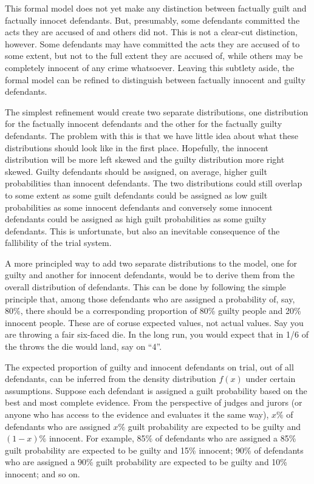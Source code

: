 \documentclass[10pt,dvipsnames,enabledeprecatedfontcommands]{scrartcl}
\begin{document}
This formal model does not yet make any distinction between factually
guilt and factually innocet defendants. But, presumably, some defendants
committed the acts they are accused of and others did not. This is not a
clear-cut distinction, however. Some defendants may have committed the
acts they are accused of to some extent, but not to the full extent they
are accused of, while others may be completely innocent of any crime
whatsoever. Leaving this subtlety aside, the formal model can be refined
to distinguish between factually innocent and guilty defendants.

The simplest refinement would create two separate distributions, one
distribution for the factually innocent defendants and the other for the
factually guilty defendants. The problem with this is that we have
little idea about what these distributions should look like in the first
place. Hopefully, the innocent distribution will be more left skewed and
the guilty distribution more right skewed. Guilty defendants should be
assigned, on average, higher guilt probabilities than innocent
defendants. The two distributions could still overlap to some extent as
some guilt defendants could be assigned as low guilt probabilities as
some innocent defendants and conversely some innocent defendants could
be assigned as high guilt probabilities as some guilty defendants. This
is unfortunate, but also an inevitable consequence of the fallibility of
the trial system.

A more principled way to add two separate distributions to the model,
one for guilty and another for innocent defendants, would be to derive
them from the overall distribution of defendants. This can be done by
following the simple principle that, among those defendants who are
assigned a probability of, say, 80\%, there should be a corresponding
proportion of 80\% guilty people and 20\% innocent people. These are of
coruse expected values, not actual values. Say you are throwing a fair
six-faced die. In the long run, you would expect that in 1/6 of the
throws the die would land, say on ``4''.

The expected proportion of guilty and innocent defendants on trial, out
of all defendants, can be inferred from the density distribution
\(f(x)\) under certain assumptions. Suppose each defendant is assigned a
guilt probability based on the best and most complete evidence. From the
perspective of judges and jurors (or anyone who has access to the
evidence and evaluates it the same way), \(x\%\) of defendants who are
assigned \(x\%\) guilt probability are expected to be guilty and
\((1-x)\%\) innocent. For example, 85\% of defendants who are assigned a
85\% guilt probability are expected to be guilty and 15\% innocent; 90\%
of defendants who are assigned a 90\% guilt probability are expected to
be guilty and 10\% innocent; and so on.
\end{document}
